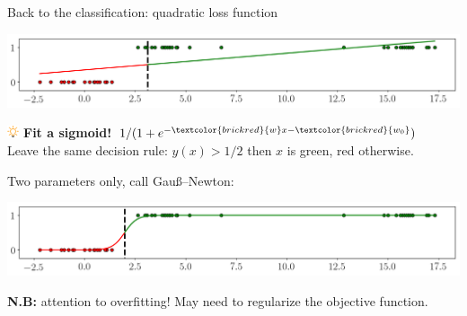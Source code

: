 \documentclass[UKenglish,aspectratio=169]{beamer}
\newcommand\unknown[1]{\textcolor{brickred}{#1}}
\begin{document}
\begin{frame}
\inputminted[frame=single]{python}{listings/logistic-1d.py}
\end{frame}

\begin{frame}{Back to the classification: quadratic loss function}
\centerline{\includegraphics[width=.9\linewidth]{../manuscript/img/linear-1d-b.png}}

\pause
\vspace{1ex}
\includegraphics[width=10pt]{../manuscript/img/idea.png} \textbf{Fit a sigmoid!} $1/(1+e^{-\unknown{w}x - \unknown{w_0}})$\\
Leave the same decision rule: $y(x)>1/2$ then $x$ is green, red otherwise.

\pause
\vspace{1ex}
Two parameters only, call Gauß–Newton:
\centerline{\includegraphics[width=.9\linewidth]{../manuscript/img/logistic-1d-b.png}}

\textbf{N.B:} attention to overfitting! May need to regularize the objective function.
\end{frame}
\end{document}

